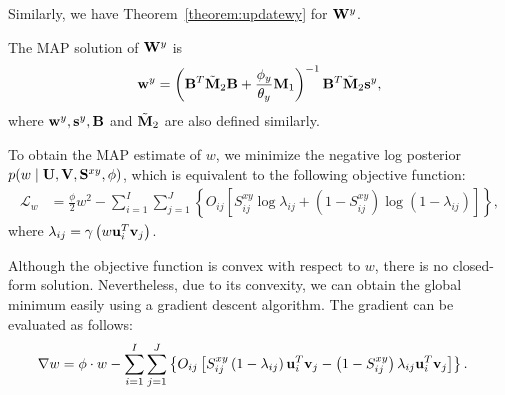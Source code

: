 Similarly, we have Theorem~\ref{theorem:updatewy} for $ {\bf W}^{y} $.


\begin{mythe}
The \mbox{MAP} solution of ${\bf W}^{y}$ is
\begin{align}
{\bf w}^{y} =\left({\bf B}^T\tilde{{\bf M}}_2{\bf B} +\frac{\phi_y}{\theta_y}{\bf M}_1\right)^{-1}{\bf B}^T\tilde{{\bf M}}_2{\bf s}^y,\nonumber
\end{align}
where ${\bf w}^{y}, {\bf s}^{y}, {\bf B}$ and $\tilde{{\bf M}}_2$ are also defined similarly.
\label{theorem:updatewy}
\end{mythe}

To obtain the \mbox{MAP} estimate of $w$, we minimize the negative log posterior $p(w\mid {\bf U}, {\bf V}, {\bf S}^{xy},\phi)$, which is equivalent to the following objective function:
\begin{align}
\mathcal{L}_{w} &= \frac{\phi }{2}w^2-\sum\limits_{i=1}^{I}\sum\limits_{j=1}^{J}\left\{O_{ij}\left[S^{xy}_{ij}\log\lambda_{ij} + \left(1-S^{xy}_{ij}\right)\log\left(1-\lambda_{ij}\right)\right]\right\},\nonumber
\end{align}
where $\lambda_{ij} = \gamma\left(w{\bf u}_{i}^{T}{\bf v}_{j}\right)$.

Although the objective function is convex with respect to $w$, there is no closed-form solution.  Nevertheless, due to its convexity, we can obtain the global minimum easily using a gradient descent algorithm.  The gradient can be evaluated as follows: %
\begin{align}
\label{equation:updatew}
\nabla w &=\phi \cdot w -\sum\limits_{i=1}^{I}\sum\limits_{j=1}^{J}\left\{O_{ij}\left[S^{xy}_{ij}\left(1-\lambda_{ij}\right){\bf u}_{i}^{T}{\bf v}_{j}-\left(1-S^{xy}_{ij}\right)\lambda_{ij}{\bf u}_{i}^{T}{\bf v}_{j}\right]\right\}.
\end{align}

